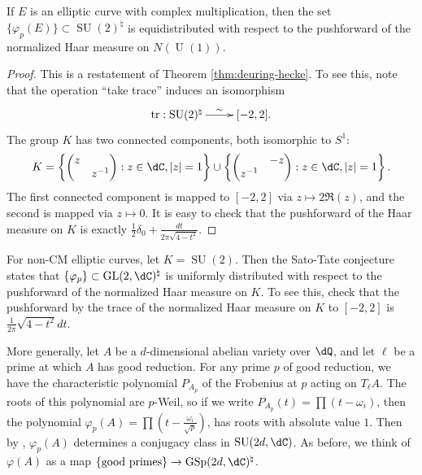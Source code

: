 \begin{theorem}
If $E$ is an elliptic curve with complex multiplication, then the 
set $\{\varphi_p(E)\}\subset \operatorname{SU}(2)^\natural$ is 
equidistributed with respect to the pushforward of the normalized Haar measure 
on $N(\operatorname{U}(1))$. 
\end{theorem}
\begin{proof}
This is a restatement of Theorem \ref{thm:deuring-hecke}. To see this, note 
that the operation ``take trace'' induces an isomorphism 
\[\xymatrix{
  \trace : \operatorname{SU}(2)^\natural \ar[r]^-\sim 
    & [-2,2] \text{.}
}\]
The group $K$ has two connected components, both isomorphic to $S^1$:
\[
  K = 
  \left\{\begin{pmatrix} z & \\ & z^{-1} \end{pmatrix} : z\in \dC,|z|=1 \right\} \cup \left\{\begin{pmatrix}  & -z\\ z^{-1} & \end{pmatrix} : z\in \dC ,|z|=1\right\} \text{.}
\]
The first connected component is mapped to $[-2,2]$ via 
$z\mapsto 2\Re (z)$, and the second is mapped via $z\mapsto 0$. It is easy to 
check that the pushforward of the Haar measure on $K$ is exactly 
$\frac 1 2 \delta_0 + \frac{dt}{2\pi \sqrt{4-t^2}}$. 
\end{proof}

For non-CM elliptic curves, let $K=\operatorname{SU}(2)$. Then the Sato-Tate 
conjecture states that $\{\varphi_p\}\subset \gl{2}{\dC}^\natural$ is 
uniformly distributed with respect to the pushforward of the normalized Haar 
measure on $K$. To see this, check that the pushforward by the trace of the 
normalized Haar measure on $K$ to $[-2,2]$ is $\frac{1}{2\pi} \sqrt{4-t^2} dt$. 

More generally, let $A$ be a $d$-dimensional abelian variety over $\dQ$, and 
let $\ell$ be a prime at which $A$ has good reduction. For any prime $p$ of 
good reduction, we have the characteristic polynomial $P_{A_p}$ of the 
Frobenius at $p$ acting on $T_\ell A$. The roots of this polynomial are 
$p$-Weil, so if we write $P_{A_p}(t) = \prod (t-\omega_i)$, then the polynomial 
$\varphi_p(A) = \prod \left(t-\frac{\omega_i}{\sqrt p}\right)$, has roots with 
absolute value $1$. Then by \cite[13.1]{ka88}, $\varphi_p(A)$ determines a 
conjugacy class in $\operatorname{SU}(2 d,\dC)$. As before, we think of 
$\varphi(A)$ as a map 
$\{\text{good primes}\}\to \operatorname{GSp}(2 d,\dC)^\natural$. 

